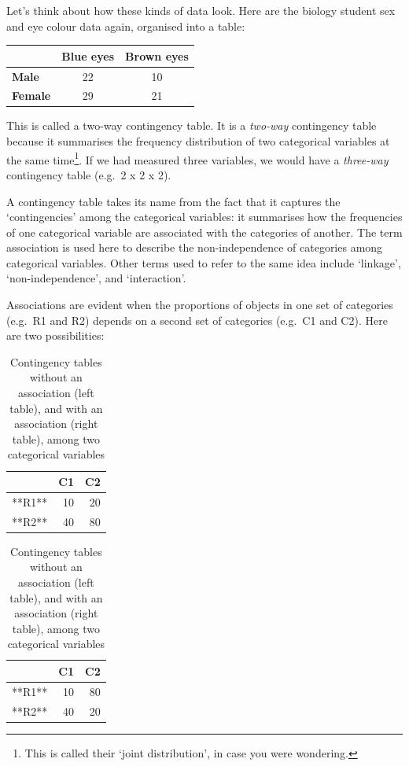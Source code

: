\documentclass[
]{book}
\begin{document}
Let's think about how these kinds of data look. Here are the biology student sex and eye colour data again, organised into a table:

\begin{longtable}[]{@{}lcc@{}}
\toprule()
& Blue eyes & Brown eyes \\
\midrule()
\endhead
\textbf{Male} & 22 & 10 \\
\textbf{Female} & 29 & 21 \\
\bottomrule()
\end{longtable}

This is called a two-way contingency table. It is a \emph{two-way} contingency table because it summarises the frequency distribution of two categorical variables at the same time\footnote{This is called their `joint distribution', in case you were wondering.}. If we had measured three variables, we would have a \emph{three-way} contingency table (e.g.~2 x 2 x 2).

A contingency table takes its name from the fact that it captures the `contingencies' among the categorical variables: it summarises how the frequencies of one categorical variable are associated with the categories of another. The term association is used here to describe the non-independence of categories among categorical variables. Other terms used to refer to the same idea include `linkage', `non-independence', and `interaction'.

Associations are evident when the proportions of objects in one set of categories (e.g.~R1 and R2) depends on a second set of categories (e.g.~C1 and C2). Here are two possibilities:

\begin{table}
\caption{\label{tab:unnamed-chunk-199}Contingency tables without an association (left table), 
             and with an association (right table), among two categorical variables}

\centering
\begin{tabular}[t]{lrr}
\toprule
  & C1 & C2\\
\midrule
**R1** & 10 & 20\\
**R2** & 40 & 80\\
\bottomrule
\end{tabular}
\centering
\begin{tabular}[t]{lrr}
\toprule
  & C1 & C2\\
\midrule
**R1** & 10 & 80\\
**R2** & 40 & 20\\
\bottomrule
\end{tabular}
\end{table}
\end{document}
